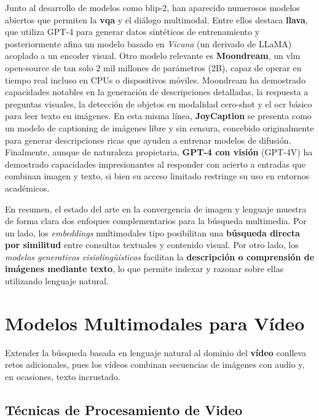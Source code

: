 Junto al desarrollo de modelos como \gls{blip}-2, han aparecido numerosos modelos abiertos que permiten la \textbf{\gls{vqa}} y el diálogo multimodal. Entre ellos destaca \textbf{\gls{llava}}, que utiliza GPT-4 para generar datos sintéticos de entrenamiento y posteriormente afina un modelo basado en \emph{Vicuna} (un derivado de LLaMA) acoplado a un encoder visual. Otro modelo relevante es \textbf{Moondream}, un \gls{vlm} open-source de tan solo 2 mil millones de parámetros (2B), capaz de operar en tiempo real incluso en CPUs o dispositivos móviles. Moondream ha demostrado capacidades notables en la generación de descripciones detalladas, la respuesta a preguntas visuales, la detección de objetos en modalidad cero-shot y el \gls{ocr} básico para leer texto en imágenes. En esta misma línea, \textbf{JoyCaption} se presenta como un modelo de captioning de imágenes libre y sin censura, concebido originalmente para generar descripciones ricas que ayuden a entrenar modelos de difusión. Finalmente, aunque de naturaleza propietaria, \textbf{GPT-4 con visión} (GPT-4V) ha demostrado capacidades impresionantes al responder con acierto a entradas que combinan imagen y texto, si bien su acceso limitado restringe su uso en entornos académicos.

En resumen, el estado del arte en la convergencia de imagen y lenguaje muestra de forma clara dos enfoques complementarios para la búsqueda multimedia. Por un lado, los \emph{embeddings} multimodales tipo  posibilitan una \textbf{búsqueda directa por similitud} entre consultas textuales y contenido visual. Por otro lado, los \emph{modelos generativos visiolingüísticos} facilitan la \textbf{descripción o comprensión de imágenes mediante texto}, lo que permite indexar y razonar sobre ellas utilizando lenguaje natural.

\section{Modelos Multimodales para Vídeo}

Extender la búsqueda basada en lenguaje natural al dominio del \textbf{vídeo} conlleva retos adicionales, pues los vídeos combinan secuencias de imágenes con audio y, en ocasiones, texto incrustado.

\subsection{Técnicas de Procesamiento de Video}

